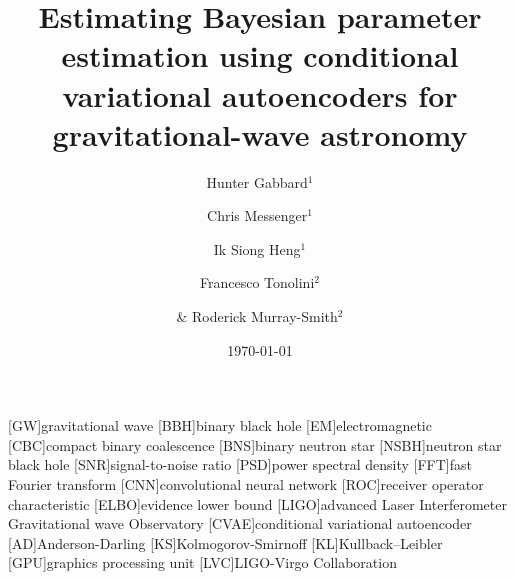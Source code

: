 \documentclass[%
showpacs,
 amsmath,amssymb,
 aps,
 twocolumn,
 prl,
 reprint,
floatfix,
]{revtex4-1}
\begin{document}

\title{Estimating Bayesian parameter estimation using conditional variational
autoencoders for gravitational-wave astronomy}

\author{Hunter Gabbard$^1$}
\author{Chris Messenger$^1$}
\author{Ik Siong Heng$^1$}
\author{Francesco Tonolini$^2$}
\author{\& Roderick Murray-Smith$^2$}


\date{\today}

\maketitle

%

[GW]{gravitational wave}
[BBH]{binary black hole}
[EM]{electromagnetic}
[CBC]{compact binary coalescence}
[BNS]{binary neutron star}
[NSBH]{neutron star black hole}
[SNR]{signal-to-noise ratio}
[PSD]{power spectral density}
[FFT]{fast Fourier transform}
[CNN]{convolutional neural network}
[ROC]{receiver operator characteristic}
[ELBO]{evidence lower bound}
[LIGO]{advanced Laser Interferometer Gravitational wave Observatory}
[CVAE]{conditional variational autoencoder}
[AD]{Anderson-Darling}
[KS]{Kolmogorov-Smirnoff}
[KL]{Kullback–Leibler}
[GPU]{graphics processing unit}
[LVC]{LIGO-Virgo Collaboration}
\end{document}
